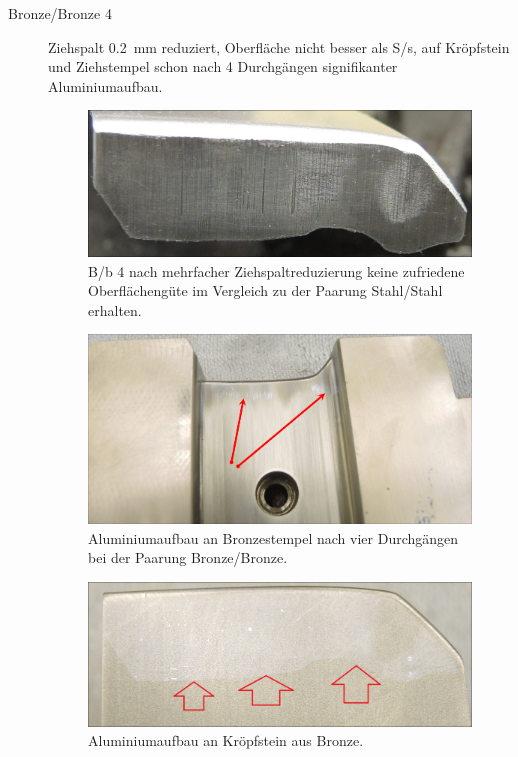 \documentclass[12pt,a4paper,parskip,twoside,BCOR5mm,headsepline]{scrartcl}
\begin{document}
\begin{description*}
\begin{description}
\item[Bronze/Bronze 4] Ziehspalt \SI{0.2}{\milli\meter} reduziert, Oberfläche nicht besser als S/s, auf Kröpfstein und Ziehstempel schon nach 4 Durchgängen signifikanter Aluminiumaufbau.
\begin{figure}[H]
\centering
\includegraphics[width=.8\textwidth]{Bb4}
\caption{B/b 4 nach mehrfacher Ziehspaltreduzierung keine zufriedene Oberflächengüte im Vergleich zu der Paarung Stahl/Stahl erhalten.}
\label{fig:Bb4}
\end{figure}
\newpage
\begin{figure}[H]
\centering
\includegraphics[width=.8\textwidth]{PunchBAlubau}
\caption{Aluminiumaufbau an Bronzestempel nach vier Durchgängen bei der Paarung Bronze/Bronze.}
\label{fig:PunchBAlubau}
\end{figure}
\begin{figure}[H]
\centering
\includegraphics[width=.8\textwidth]{DieBAlubau}
\caption{Aluminiumaufbau an Kröpfstein aus Bronze.}
\label{fig:DieBAlubauMark}
\end{figure}
\newpage


\end{description}
\end{description*}
\end{document}
